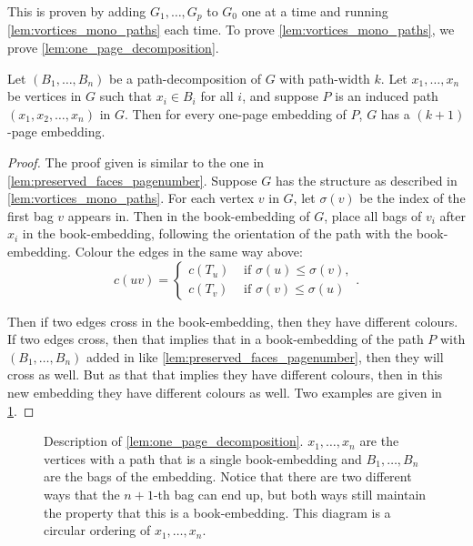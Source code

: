 This is proven by adding $G_1, \ldots, G_p$ to $G_0$ one at a time and running \cref{lem:vortices_mono_paths} each time. To prove \cref{lem:vortices_mono_paths}, we prove \cref{lem:one_page_decomposition}.
\begin{lemma}\label{lem:one_page_decomposition}
	Let \((B_1, \ldots, B_n)\) be a path-decomposition of \(G\) with path-width \(k\). Let \(x_1, \ldots, x_n\) be vertices in \(G\) such that \(x_i \in B_i\) for all \(i\), and suppose \(P\) is an induced path \((x_1, x_2, \ldots, x_n)\) in \(G\). Then for every one-page embedding of \(P\), \(G\) has a \((k + 1)\)-page embedding.
\end{lemma}
\begin{proof}
	The proof given is similar to the one in \cref{lem:preserved_faces_pagenumber}. 
	Suppose \(G\) has the structure as described in \cref{lem:vortices_mono_paths}. For each vertex \(v\) in \(G\), let \(\sigma(v)\) be the index of the first bag \(v\) appears in. Then in the book-embedding of \(G\), place all bags of \(v_i\) after \(x_i\) in the book-embedding, following the orientation of the path with the book-embedding. Colour the edges in the same way above: 
	\begin{equation}
		c(uv) =
		\begin{cases}
			c(T_u) & \text{ if } \sigma(u) \leq \sigma(v), \\
			c(T_v) & \text{ if } \sigma(v) \leq \sigma(u)
		\end{cases}.
	\end{equation}

	Then if two edges cross in the book-embedding, then they have different colours. If two edges cross, then that implies that in a book-embedding of the path \(P\) with \((B_1, \ldots, B_n)\) added in like \cref{lem:preserved_faces_pagenumber}, then they will cross as well. But as that that implies they have different colours, then in this new embedding they have different colours as well. Two examples are given in \cref{fig:preserving_pages}.
\end{proof}

\begin{figure}[h!]
	\centering
	
	\caption[One-page decomposition]{Description of \cref{lem:one_page_decomposition}. \(x_1, \ldots, x_n\) are the vertices with a path that is a single book-embedding and \(B_1, \ldots, B_n\) are the bags of the embedding. Notice that there are two different ways that the \(n + 1\)-th bag can end up, but both ways still maintain the property that this is a book-embedding. This diagram is a circular ordering of \(x_1, \ldots, x_n\).}\label{fig:preserving_pages}
\end{figure}

